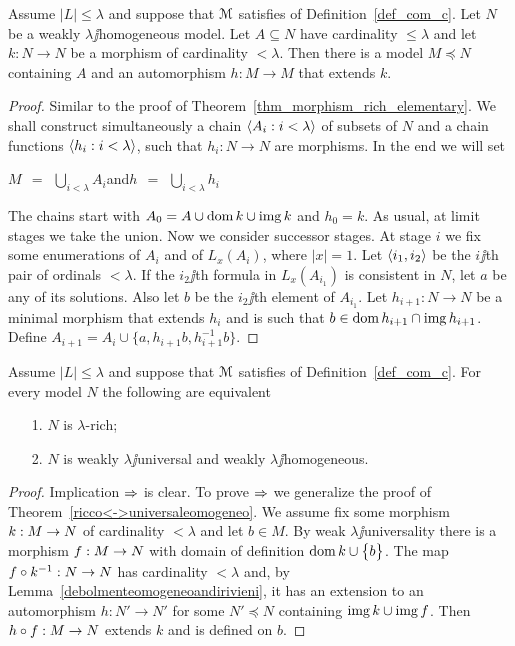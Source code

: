 \documentclass[creche.tex]{subfiles}
\begin{document}
\begin{lemma}\label{debolmenteomogeneoandirivieni}
Assume $|L|\le\lambda$ and suppose that $\EuScript M$ satisfies  of Definition~\ref{def_com_c}. Let $N$ be a weakly $\lambda\jj$ho\-mo\-ge\-ne\-ous model. Let $A\subseteq N$ have cardinality $\le\lambda$ and let $k:N\to N$ be a morphism of cardinality $<\lambda$. Then there is a model  $M\preceq N$ containing $A$ and an automorphism $h:M\to M$ that extends $k$.
\end{lemma}

\begin{proof}
Similar to the proof of Theorem~\ref{thm_morphism_rich_elementary}. We shall construct simultaneously a chain $\langle A_i:i<\lambda\rangle$ of subsets of $N$ and a chain functions $\langle h_i:i<\lambda\rangle$, such that $h_i:N\to N$ are morphisms. In the end we will set

\hfil $\displaystyle M\ \ =\ \ \bigcup_{i<\lambda}A_i$\hfil  and\hfil  $\displaystyle h\ \ =\ \ \bigcup_{i<\lambda}h_i$ 

The chains start with $A_0=A\cup\mathop{\rm dom} k\cup\mathop{\rm img} k$ and $h_0=k$. As usual, at limit stages we take the union. Now we consider successor stages. At stage $i$ we fix some enumerations of $A_i$ and of $L_x(A_i)$, where $|x|=1$. Let $\langle i_1,i_2\rangle$ be the $i\jj$th pair of ordinals $<\lambda$. If the $i_2\jj$th formula in $L_x(A_{i_1})$ is consistent in $N$, let $a$ be any of its solutions. Also let $b$ be the $i_2\jj$th element of $A_{i_1}$. Let $h_{i+1}:N\to N$ be a minimal morphism that extends $h_i$ and is such that $b\in\mathop{\rm dom} h_{i+1}\cap\mathop{\rm img} h_{i+1}$. Define $A_{i+1}=A_i\cup\big\{a,h_{i+1}b, h_{i+1}^{-1}b\big\}$.
\end{proof}



\begin{theorem}\label{ricco=universaledebolmenteomogeneo}
Assume $|L|\le\lambda$ and suppose that $\EuScript M$ satisfies  of Definition~\ref{def_com_c}. For every model $N$ the following are equivalent
\begin{itemize}
\item[1.] $N$ is $\lambda$-rich;
\item[2.] $N$ is  weakly $\lambda\jj$universal and weakly $\lambda\jj$homogeneous.
\end{itemize}
\end{theorem}

\begin{proof} 
Implication $\Rightarrow$ is clear. To prove $\Rightarrow$ we generalize the proof of Theorem~\ref{ricco<->universaleomogeneo}. We assume  fix some morphism $k:M\rightarrow N$ of cardinality $<\lambda$ and let $b\in M$. By weak $\lambda\jj$universality there is a morphism $f:M\rightarrow N$ with domain of definition $\mathop{\rm dom} k\cup\big\{b\big\}$. The map $f\circ k^{-1}:N\rightarrow N$ has cardinality $<\lambda$ and, by Lemma~\ref{debolmenteomogeneoandirivieni}, it has an extension to an automorphism $h:N'\to N'$ for some $N'\preceq N$ containing $\mathop{\rm img} k\cup\mathop{\rm img} f$. Then $h\circ f:M\rightarrow N$ extends $k$ and is defined on $b$.
\end{proof}
\end{document}
